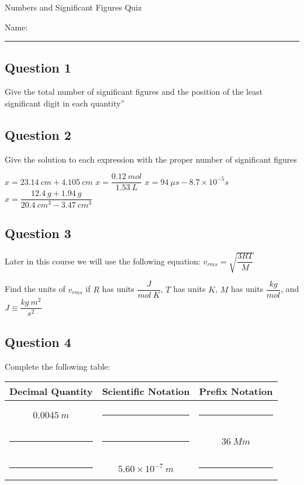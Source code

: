 \documentclass[11pt, letterpaper]{memoir}
\begin{document}
\begin{center}
	{\large	Numbers and Significant Figures Quiz}
\end{center}
{\large Name: \rule[-1mm]{4in}{.1pt}
\subsection*{Question 1}
Give the total number of significant figures and the position of the least significant digit in each quantity”


\vspace{3em}
\subsection*{Question 2}
Give the solution to each expression with the proper number of significant figures

\noindent$x = 23.14~cm+4.105~cm$ \hspace{2em} $x = \dfrac{0.12~mol}{1.53~L}$ \hspace{2em} $x=94~\mu s - 8.7\times10^{-5}s$ \hspace{2em} $x=\dfrac{12.4~g+1.94~g}{20.4~cm^3-3.47~cm^3}$

\vspace{3em}
\subsection*{Question 3}
Later in this course we will use the following equation: $v_{rms}=\sqrt{\dfrac{3RT}{M}}$

\noindent Find the units of $v_{rms}$ if $R$ has units $\dfrac{J}{mol~K}$, $T$ has units $K$, $M$ has units $\dfrac{kg}{mol}$, and $J\equiv \dfrac{kg~m^2}{s^2}$

\vspace{3em}
\subsection*{Question 4}
Complete the following table:

\begin{tabular}{ccc}
	Decimal Quantity      & Scientific Notation   & Prefix Notation       \\ \midrule \\
	$0.0045~m$            & \rule[-2pt]{8em}{1pt} & \rule[-2pt]{8em}{1pt} \\ \\
	\rule[-2pt]{8em}{1pt} & \rule[-2pt]{8em}{1pt} & $36~Mm$               \\ \\
	\rule[-2pt]{8em}{1pt} & $5.60\times10^{-7}~m$ & \rule[-2pt]{8em}{1pt} \\
\end{tabular}



}
\end{document}
